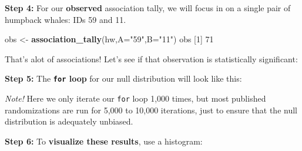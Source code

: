 \documentclass[
]{book}
\newenvironment{Shaded}{\begin{snugshade}}{\end{snugshade}}
\newcommand{\CommentTok}[1]{\textcolor[rgb]{0.56,0.35,0.01}{\textit{#1}}}
\newcommand{\ControlFlowTok}[1]{\textcolor[rgb]{0.13,0.29,0.53}{\textbf{#1}}}
\newcommand{\DataTypeTok}[1]{\textcolor[rgb]{0.13,0.29,0.53}{#1}}
\newcommand{\DecValTok}[1]{\textcolor[rgb]{0.00,0.00,0.81}{#1}}
\newcommand{\KeywordTok}[1]{\textcolor[rgb]{0.13,0.29,0.53}{\textbf{#1}}}
\newcommand{\NormalTok}[1]{#1}
\newcommand{\OperatorTok}[1]{\textcolor[rgb]{0.81,0.36,0.00}{\textbf{#1}}}
\newcommand{\OtherTok}[1]{\textcolor[rgb]{0.56,0.35,0.01}{#1}}
\newcommand{\StringTok}[1]{\textcolor[rgb]{0.31,0.60,0.02}{#1}}
\begin{document}
\textbf{Step 4:} For our \textbf{observed} association tally, we will focus in on a single pair of humpback whales: IDs 59 and 11.

\begin{Shaded}
\begin{Highlighting}[]
\NormalTok{obs <-}\StringTok{ }\KeywordTok{association_tally}\NormalTok{(hw,}\DataTypeTok{A=}\StringTok{"59"}\NormalTok{,}\DataTypeTok{B=}\StringTok{"11"}\NormalTok{)}
\NormalTok{obs}
\NormalTok{[}\DecValTok{1}\NormalTok{] }\DecValTok{71}
\end{Highlighting}
\end{Shaded}

That's alot of associations! Let's see if that observation is statistically significant:

\textbf{Step 5:} The \textbf{\texttt{for} loop} for our null distribution will look like this:

\begin{Shaded}
\end{Shaded}

\emph{Note!} Here we only iterate our \texttt{for} loop 1,000 times, but most published randomizations are run for 5,000 to 10,000 iterations, just to ensure that the null distribution is adequately unbiased.

\textbf{Step 6:} To \textbf{visualize these results}, use a histogram:
\end{document}

